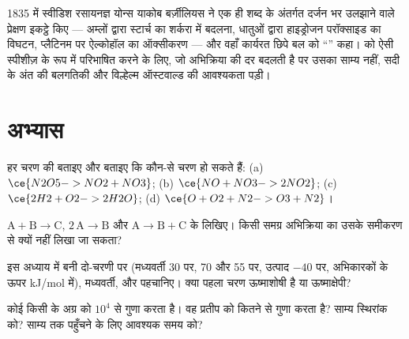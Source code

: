 \begin{history}[उत्प्रेरण, 1835]
1835 में स्वीडिश रसायनज्ञ योन्स याकोब बर्ज़ीलियस ने एक ही शब्द के अंतर्गत
दर्जन भर उलझाने वाले प्रेक्षण इकट्ठे किए --- अम्लों द्वारा स्टार्च का शर्करा में बदलना,
धातुओं द्वारा हाइड्रोजन परॉक्साइड का विघटन, प्लैटिनम पर ऐल्कोहॉल का ऑक्सीकरण ---
और वहाँ कार्यरत छिपे बल को ``'' कहा।  को ऐसी स्पीशीज़ के रूप में परिभाषित करने के लिए,
जो अभिक्रिया की दर बदलती है पर उसका साम्य नहीं, सदी के अंत की बलगतिकी और
विल्हेल्म ऑस्टवाल्ड की आवश्यकता पड़ी।
\end{history}

\section{अभ्यास}

\begin{exercise}[$\star$]\label{exo:b1:elementary-steps:1}
हर चरण की  बताइए और बताइए कि कौन-से चरण  हो सकते हैं:
(a) $\ce{N2O5 -> NO2 + NO3}$; (b) $\ce{NO + NO3 -> 2NO2}$;
(c) $\ce{2H2 + O2 -> 2H2O}$; (d) $\ce{O + O2 + N2 -> O3 + N2}$।
\end{exercise}

\begin{exercise}[$\star$]\label{exo:b1:elementary-steps:2}
 $\mathrm{A} + \mathrm{B} \to
\mathrm{C}$, $2\,\mathrm{A} \to \mathrm{B}$ और $\mathrm{A} \to \mathrm{B} +
\mathrm{C}$ के  लिखिए। किसी समग्र अभिक्रिया का  उसके
समीकरण से क्यों नहीं लिखा जा सकता?
\end{exercise}

\begin{exercise}[$\star$]\label{exo:b1:elementary-steps:3}
इस अध्याय में बनी दो-चरणी  पर (मध्यवर्ती
30 पर,  70 और 55 पर, उत्पाद $-40$ पर, अभिकारकों के ऊपर
\unit{kJ/mol} में), मध्यवर्ती,  और  पहचानिए।
क्या पहला चरण ऊष्माशोषी है या ऊष्माक्षेपी?
\end{exercise}

\begin{exercise}[$\star$]\label{exo:b1:elementary-steps:4}
कोई  किसी  के अग्र  को
$10^4$ से गुणा करता है। वह प्रतीप  को कितने से गुणा करता है? साम्य
स्थिरांक को? साम्य तक पहुँचने के लिए आवश्यक समय को?
\end{exercise}


